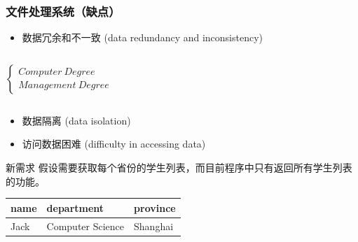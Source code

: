\documentclass[aspectratio=169, 14pt]{beamer}
\begin{document}
\begin{frame}
    \frametitle{文件处理系统（缺点）}

\begin{itemize}
    \item \alert{数据冗余和不一致} (data redundancy and inconsistency)
\end{itemize}

\begin{columns}

     \(
      \begin{cases}
        Computer\ Degree \\
        Management\ Degree 
      \end{cases}
      \)
\end{columns}
\pause
\begin{itemize}
    \item \alert{数据隔离
    } (data isolation)
\end{itemize}


\end{frame}

\begin{frame}
\begin{itemize}
    \item \alert{访问数据困难
    } (difficulty in accessing data)
\end{itemize}
    \begin{block}{新需求}
假设需要获取每个省份的学生列表，而目前程序中只有返回所有学生列表的功能。
    \end{block}

    \begin{table}
        \begin{tabular}{lll}
          \toprule
          name & department & province \\
          \midrule
          Jack & Computer Science & Shanghai \\
          \bottomrule
        \end{tabular}
    \end{table}

\end{frame}
\end{document}
